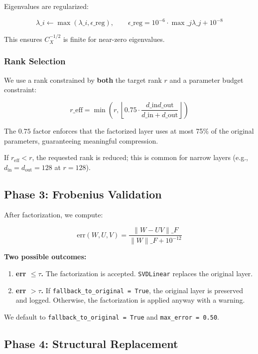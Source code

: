 Eigenvalues are regularized:

\[
\lambda\_i \leftarrow \max(\lambda\_i, \epsilon\_\text{reg}), \qquad
\epsilon\_\text{reg} = 10^{-6} \cdot \max\_j \lambda\_j + 10^{-8}
\tag{4.13}
\]

This ensures $C_X^{-1/2}$ is finite for near-zero eigenvalues.

\subsubsection{Rank Selection}

We use a rank constrained by \textbf{both} the target rank $r$ and a parameter 
budget constraint:

\[
r\_\text{eff} = \min\!\left(r, \left\lfloor 0.75 \cdot \frac{d\_\text{in} d\_\text{out}}{d\_\text{in} + d\_\text{out}} \right\rfloor \right)
\tag{4.14}
\]

The $0.75$ factor enforces that the factorized layer uses at most 75\% of the 
original parameters, guaranteeing meaningful compression.

If $r_\text{eff} < r$, the requested rank is reduced; this is common for 
narrow layers (e.g., $d_\text{in} = d_\text{out} = 128$ at $r = 128$).

\subsection{Phase 3: Frobenius Validation}

After factorization, we compute:

\[
\text{err}(W, U, V) = \frac{\|W - UV\|\_F}{\|W\|\_F + 10^{-12}}
\tag{4.15}
\]

\textbf{Two possible outcomes:}

\begin{enumerate}
\item \textbf{err $\leq \tau$.} The factorization is accepted. \texttt{SVDLinear} replaces
  the original layer.
\item \textbf{err $> \tau$.} If \texttt{fallback\_to\_original = True}, the original layer
  is preserved and logged. Otherwise, the factorization is applied anyway
  with a warning.

\end{enumerate}
We default to \texttt{fallback\_to\_original = True} and \texttt{max\_error = 0.50}.

\subsection{Phase 4: Structural Replacement}

